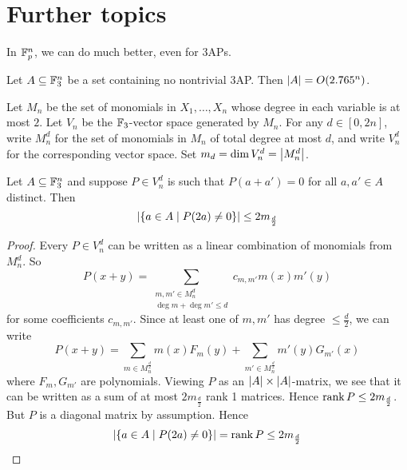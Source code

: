 \documentclass{article}
\begin{document}
\newpage

\section{Further topics}

In $\mathbb F_p^n$, we can do much better, even for 3APs.

\begin{nthm}
  Let $A \subseteq \mathbb F_3^n$ be a set containing no nontrivial 3AP. Then $\left\lvert A\right\rvert = O(2.765^n)$.
\end{nthm}

Let $M_n$ be the set of monomials in $X_1, \dots, X_n$ whose degree in each variable is at most $2$. Let $V_n$ be the $\mathbb F_3$-vector space generated by $M_n$. For any $d \in [0, 2n]$, write $M_n^d$ for the set of monomials in $M_n$ of total degree at most $d$, and write $V_n^d$ for the corresponding vector space. Set $m_d = \dim V_n^d = \left\lvert M_n^d\right\rvert$.

\begin{nlemma}\label{lem:polynomial-diagonal}
  Let $A \subseteq \mathbb F_3^n$ and suppose $P \in V_n^d$ is such that $P(a + a') = 0$ for all $a, a' \in A$ distinct. Then
  $$\left\lvert \{a \in A \mid P(2a) \ne 0\}\right\rvert \le 2m_{\frac d2}$$
\end{nlemma}
\begin{proof}
  Every $P \in V_n^d$ can be written as a linear combination of monomials from $M_n^d$. So
  $$P(x + y) = \sum_{\substack{m, m' \in M_n^d \\ \deg m + \deg m' \le d}} c_{m, m'} m(x)m'(y)$$
  for some coefficients $c_{m, m'}$. Since at least one of $m, m'$ has degree $\le \frac d2$, we can write
  $$P(x + y) = \sum_{m \in M_n^{\frac d2}} m(x) F_m(y) + \sum_{m' \in M_n^{\frac d2}} m'(y) G_{m'}(x)$$
  where $F_m, G_{m'}$ are polynomials. Viewing $P$ as an $\left\lvert A\right\rvert \times \left\lvert A\right\rvert$-matrix, we see that it can be written as a sum of at most $2m_{\frac d2}$ rank 1 matrices. Hence $\operatorname{rank} P \le 2m_{\frac d2}$. But $P$ is a diagonal matrix by assumption. Hence
  $$\left\lvert \{a \in A \mid P(2a) \ne 0\}\right\rvert = \operatorname{rank} P \le 2m_{\frac d2}$$
\end{proof}
\end{document}
